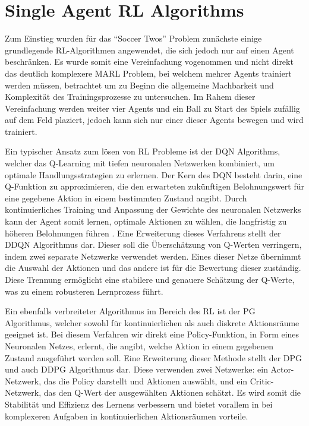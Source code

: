 \section{Single Agent RL Algorithms}

Zum Einstieg wurden für das ``Soccer Twos'' Problem zunächste einige grundlegende \ac{RL}-Algorithmen angewendet, die sich jedoch nur auf einen Agent beschränken. Es wurde somit eine Vereinfachung vogenommen und nicht direkt das deutlich komplexere \ac{MARL} Problem, bei welchem mehrer Agents trainiert werden müssen, betrachtet um zu Beginn die allgemeine Machbarkeit und Komplexität des Trainingsprozesse zu untersuchen. Im Rahem dieser Vereinfachung werden weiter vier Agents und ein Ball zu Start des Spiels zufällig auf dem Feld plaziert, jedoch kann sich nur einer dieser Agents bewegen und wird trainiert. 

Ein typischer Ansatz zum lösen von \ac{RL} Probleme ist der \ac{DQN} Algorithms, welcher das Q-Learning mit tiefen neuronalen Netzwerken kombiniert, um optimale Handlungsstrategien zu erlernen. Der Kern des \ac{DQN} besteht darin, eine Q-Funktion zu approximieren, die den erwarteten zukünftigen Belohnungswert für eine gegebene Aktion in einem bestimmten Zustand angibt. %
Durch kontinuierliches Training und Anpassung der Gewichte des neuronalen Netzwerks kann der Agent somit lernen, optimale Aktionen zu wählen, die langfristig zu höheren Belohnungen führen \cite{mnih2013}. 
Eine Erweiterung dieses Verfahrens stellt der \ac{DDQN} Algorithmus dar.  Dieser soll die Überschätzung von Q-Werten verringern, indem zwei separate Netzwerke verwendet werden. Eines dieser Netze übernimmt die Auswahl der Aktionen und das andere ist für die Bewertung dieser zuständig. Diese Trennung ermöglicht eine stabilere und genauere Schätzung der Q-Werte, was zu einem robusteren Lernprozess führt.

Ein ebenfalls verbreiteter Algorithmus im Bereich des \ac{RL} ist der \ac{PG} Algorithmus, welcher sowohl für kontinuierlichen als auch diskrete Aktionsräume geeignet ist. Bei diesem Verfahren wir direkt eine Policy-Funktion, in Form eines Neuronalen Netzes, erlernt, die angibt, welche Aktion in einem gegebenen Zustand ausgeführt werden soll.
Eine Erweiterung dieser Methode stellt der \ac{DPG} und auch \ac{DDPG} Algorithmus dar. Diese verwenden zwei Netzwerke: ein Actor-Netzwerk, das die Policy darstellt und Aktionen auswählt, und ein Critic-Netzwerk, das den Q-Wert der ausgewählten Aktionen schätzt. Es wird somit die Stabilität und Effizienz des Lernens verbessern und bietet vorallem in bei komplexeren Aufgaben in kontinuierlichen Aktionsräumen vorteile. %

